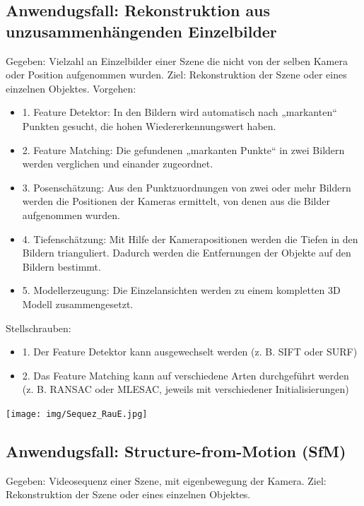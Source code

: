 \subsection{Anwendugsfall: Rekonstruktion aus unzusammenhängenden Einzelbilder}
Gegeben: Vielzahl an Einzelbilder einer Szene die nicht von der selben Kamera oder Position aufgenommen wurden.
Ziel: Rekonstruktion der Szene oder eines einzelnen Objektes.
Vorgehen:
\begin{itemize}
\item 1. Feature Detektor: In den Bildern wird automatisch nach „markanten“ Punkten gesucht, die hohen Wiedererkennungswert haben.\item 2. Feature Matching: Die gefundenen „markanten Punkte“ in zwei Bildern werden verglichen und einander zugeordnet.\item 3. Posenschätzung: Aus den Punktzuordnungen von zwei oder mehr Bildern werden die Positionen der Kameras ermittelt, von denen aus die Bilder aufgenommen wurden.\item 4. Tiefenschätzung: Mit Hilfe der Kamerapositionen werden die Tiefen in den Bildern trianguliert. Dadurch werden die Entfernungen der Objekte auf den Bildern bestimmt.\item 5. Modellerzeugung: Die Einzelansichten werden zu einem kompletten 3D Modell zusammengesetzt.
\end{itemize}
Stellschrauben:
\begin{itemize}
\item 1. Der Feature Detektor kann ausgewechselt werden (z. B. SIFT oder SURF)\item 2. Das Feature Matching kann auf verschiedene Arten durchgeführt werden (z. B. RANSAC oder MLESAC, jeweils mit verschiedener Initialisierungen)
\end{itemize}
\texttt{[image: img/Sequez\_RauE.jpg]} 
\subsection{Anwendugsfall: Structure-from-Motion (SfM)}

Gegeben: Videosequenz einer Szene, mit eigenbewegung der Kamera.
Ziel: Rekonstruktion der Szene oder eines einzelnen Objektes.

